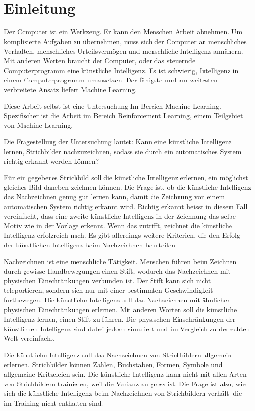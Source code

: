 \chapter{Einleitung}
Der Computer ist ein Werkzeug. Er kann den Menschen Arbeit abnehmen. Um
komplizierte Aufgaben zu übernehmen, muss sich der Computer an menschliches
Verhalten, menschliches Urteilsvermögen und menschliche Intelligenz annähern.
Mit anderen Worten braucht der Computer, oder das steuernde Computerprogramm
eine künstliche Intelligenz. Es ist schwierig, Intelligenz in einem
Computerprogramm umzusetzen. Der fähigste und am weitesten verbreitete Ansatz
liefert Machine Learning. 

Diese Arbeit selbst ist eine Untersuchung Im Bereich Machine Learning.
Spezifischer ist die Arbeit im Bereich Reinforcement Learning, einem Teilgebiet
von Machine Learning.

Die Fragestellung der Untersuchung lautet: Kann eine künstliche Intelligenz
lernen, Strichbilder nachzuzeichnen, sodass sie durch ein automatisches System
richtig erkannt werden können?

Für ein gegebenes Strichbild soll die künstliche Intelligenz erlernen, ein
möglichst gleiches Bild daneben zeichnen können. Die Frage ist, ob die
künstliche Intelligenz das Nachzeichnen genug gut lernen kann, damit die
Zeichnung von einem automatischen System richtig erkannt wird. Richtig erkannt
heisst in diesem Fall vereinfacht, dass eine zweite künstliche Intelligenz in
der Zeichnung das selbe Motiv wie in der Vorlage erkennt. Wenn das zutrifft,
zeichnet die künstliche Intelligenz erfolgreich nach. Es gibt allerdings
weitere Kriterien, die den Erfolg der künstlichen Intelligenz beim
Nachzeichnen beurteilen.

Nachzeichnen ist eine menschliche Tätigkeit. Menschen führen beim Zeichnen durch
gewisse Handbewegungen einen Stift, wodurch das Nachzeichnen mit physischen
Einschränkungen verbunden ist. Der Stift kann sich nicht teleportieren, sondern
sich nur mit einer bestimmten Geschwindigkeit fortbewegen. Die künstliche
Intelligenz soll das Nachzeichnen mit ähnlichen physischen Einschränkungen
erlernen. Mit anderen Worten soll die künstliche Intelligenz lernen, einen
Stift zu führen.  Die physischen Einschränkungen der künstlichen Intelligenz
sind dabei jedoch simuliert und im Vergleich zu der echten Welt vereinfacht. 

Die künstliche Intelligenz soll das Nachzeichnen von Strichbildern allgemein
erlernen. Strichbilder können Zahlen, Buchstaben, Formen, Symbole und
allgemeine Kritzeleien sein. Die künstliche Intelligenz kann nicht mit allen
Arten von Strichbildern trainieren, weil die Varianz zu gross ist. Die Frage
ist also, wie sich die künstliche Intelligenz beim Nachzeichnen von
Strichbildern verhält, die im Training nicht enthalten sind.

